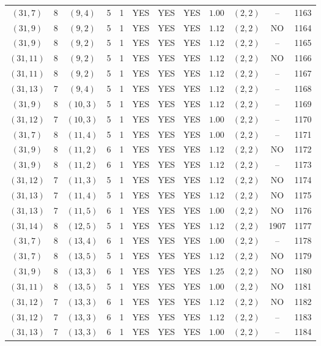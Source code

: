 \begin{longtable}{|c|c|c|c|c|c|c|c|c|c|c|c|}
$(31,7)$ & 8 & $(9,4)$ & 5 & 1 & YES & YES & YES & $1.00$ & $(2,2)$ & -- & 1163\\
$(31,9)$ & 8 & $(9,2)$ & 5 & 1 & YES & YES & YES & $1.12$ & $(2,2)$ & NO & 1164\\
$(31,9)$ & 8 & $(9,2)$ & 5 & 1 & YES & YES & YES & $1.12$ & $(2,2)$ & -- & 1165\\
$(31,11)$ & 8 & $(9,2)$ & 5 & 1 & YES & YES & YES & $1.12$ & $(2,2)$ & NO & 1166\\
$(31,11)$ & 8 & $(9,2)$ & 5 & 1 & YES & YES & YES & $1.12$ & $(2,2)$ & -- & 1167\\
$(31,13)$ & 7 & $(9,4)$ & 5 & 1 & YES & YES & YES & $1.12$ & $(2,2)$ & -- & 1168\\
$(31,9)$ & 8 & $(10,3)$ & 5 & 1 & YES & YES & YES & $1.12$ & $(2,2)$ & -- & 1169\\
$(31,12)$ & 7 & $(10,3)$ & 5 & 1 & YES & YES & YES & $1.00$ & $(2,2)$ & -- & 1170\\
$(31,7)$ & 8 & $(11,4)$ & 5 & 1 & YES & YES & YES & $1.00$ & $(2,2)$ & -- & 1171\\
$(31,9)$ & 8 & $(11,2)$ & 6 & 1 & YES & YES & YES & $1.12$ & $(2,2)$ & NO & 1172\\
$(31,9)$ & 8 & $(11,2)$ & 6 & 1 & YES & YES & YES & $1.12$ & $(2,2)$ & -- & 1173\\
$(31,12)$ & 7 & $(11,3)$ & 5 & 1 & YES & YES & YES & $1.12$ & $(2,2)$ & NO & 1174\\
$(31,13)$ & 7 & $(11,4)$ & 5 & 1 & YES & YES & YES & $1.12$ & $(2,2)$ & NO & 1175\\
$(31,13)$ & 7 & $(11,5)$ & 6 & 1 & YES & YES & YES & $1.00$ & $(2,2)$ & NO & 1176\\
$(31,14)$ & 8 & $(12,5)$ & 5 & 1 & YES & YES & YES & $1.12$ & $(2,2)$ & 1907 & 1177\\
$(31,7)$ & 8 & $(13,4)$ & 6 & 1 & YES & YES & YES & $1.00$ & $(2,2)$ & -- & 1178\\
$(31,7)$ & 8 & $(13,5)$ & 5 & 1 & YES & YES & YES & $1.12$ & $(2,2)$ & NO & 1179\\
$(31,9)$ & 8 & $(13,3)$ & 6 & 1 & YES & YES & YES & $1.25$ & $(2,2)$ & NO & 1180\\
$(31,11)$ & 8 & $(13,5)$ & 5 & 1 & YES & YES & YES & $1.00$ & $(2,2)$ & NO & 1181\\
$(31,12)$ & 7 & $(13,3)$ & 6 & 1 & YES & YES & YES & $1.12$ & $(2,2)$ & NO & 1182\\
$(31,12)$ & 7 & $(13,3)$ & 6 & 1 & YES & YES & YES & $1.12$ & $(2,2)$ & -- & 1183\\
$(31,13)$ & 7 & $(13,3)$ & 6 & 1 & YES & YES & YES & $1.00$ & $(2,2)$ & -- & 1184\\

\end{longtable}
